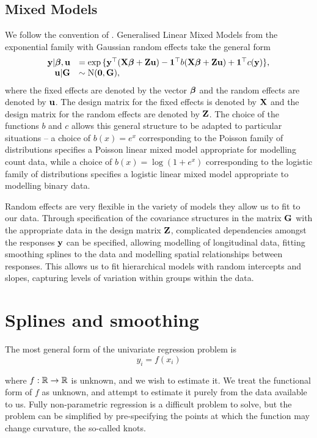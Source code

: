\subsection{Mixed Models}

We follow the convention of \citep{Zhao2006}. Generalised Linear Mixed Models from the exponential family with
Gaussian random effects take the general form
$$
\begin{array}{rl}
	{\bf y} | {\boldsymbol \beta}, {\bf u} &= \exp{\{ {\bf y}^\top ({\bf X}{\boldsymbol\beta}+ {\bf Z}{\bf u}) - {\bf1}^\top b({\bf X}{\boldsymbol\beta}+ {\bf Z}{\bf u}) + {\bf1}^\top c({\bf y}) \}}, \\
	{\bf u} | {\bf G} &\sim \text{N}({\bf 0}, {\bf G}),
\end{array}
$$
where the fixed effects are denoted by the vector ${\boldsymbol \beta}$ and the random effects are denoted by ${\bf u}$. The
design matrix for the fixed effects is denoted by ${\bf X}$ and the design matrix for the random effects are
denoted by ${\bf Z}$. The choice of the functions $b$ and $c$ allows this general structure to be adapted to
particular situations -- a choice of $b(x) = e^x$ corresponding to the Poisson family of distributions
specifies a Poisson linear mixed model appropriate for modelling count data, while a choice of $b(x) = \log(1
+ e^x)$ corresponding to the logistic family of distributions specifies a logistic linear mixed model
appropriate to modelling binary data.

Random effects are very flexible in the variety of models they allow us to fit to our data. Through
specification of the covariance structures in the matrix ${\bf G}$ with the appropriate data in the design matrix
${\bf Z}$, complicated dependencies amongst the responses ${\bf y}$ can be specified, allowing modelling of
longitudinal data, fitting smoothing splines to the data and modelling spatial relationships between
responses. This allows us to fit hierarchical models with random intercepts and slopes, capturing levels of variation within groups within the data.
\citep{Gelman2007}

\section{Splines and smoothing}
The most general form of the univariate regression problem is
\[
	y_i = f(x_i)
\]

\noindent where $f: {\mathbb{R}} \to {\mathbb{R}}$ is unknown, and we wish to estimate it. We treat the functional form of $f$ as
unknown, and attempt to estimate it purely from the data available to us. Fully non-parametric regression is a
difficult problem to solve, but the problem can be simplified by pre-specifying the points at which the
function may change curvature, the so-called knots.

